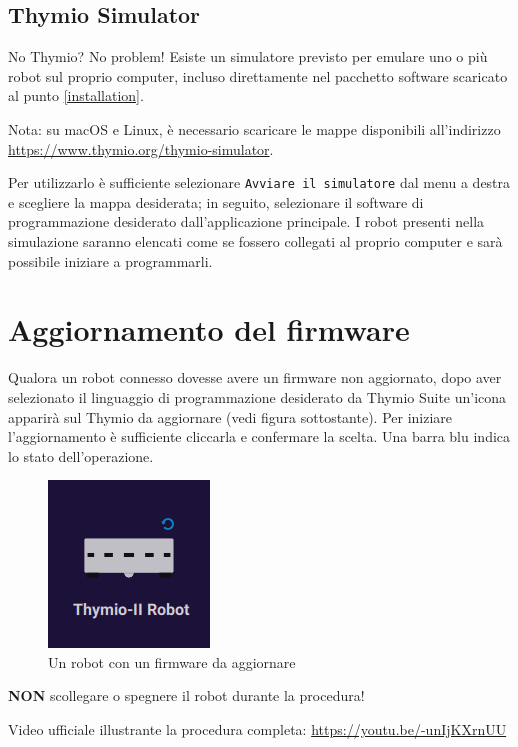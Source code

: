 \documentclass[12pt]{article}
\begin{document}
	\subsection{Thymio Simulator}
	
		No Thymio? No problem! Esiste un simulatore previsto per emulare uno o più robot sul proprio computer, incluso direttamente nel pacchetto software scaricato al punto \ref{installation}.
		
		Nota: su macOS e Linux, è necessario scaricare le mappe disponibili all'indirizzo \url{https://www.thymio.org/thymio-simulator}.
		
		Per utilizzarlo è sufficiente selezionare \texttt{Avviare il simulatore} dal menu a destra e scegliere la mappa desiderata; in seguito, selezionare il software di programmazione desiderato dall'applicazione principale.
		I robot presenti nella simulazione saranno elencati come se fossero collegati al proprio computer e sarà possibile iniziare a programmarli.
		
		
\section{Aggiornamento del firmware}
	
	Qualora un robot connesso dovesse avere un firmware non aggiornato, dopo aver selezionato il linguaggio di programmazione desiderato da Thymio Suite un'icona apparirà sul Thymio da aggiornare (vedi figura sottostante). Per iniziare l'aggiornamento è sufficiente cliccarla e confermare la scelta. Una barra blu indica lo stato dell'operazione.
	
	\begin{figure}[H]
		\centering
		\includegraphics{img/fwUpgrade.png}
		\caption{Un robot con un firmware da aggiornare}
		\label{fwUpgrade}
	\end{figure}
	
	\textbf{NON} scollegare o spegnere il robot durante la procedura!
	
	Video ufficiale illustrante la procedura completa: \url{https://youtu.be/-unIjKXrnUU}\\
	
\end{document}
